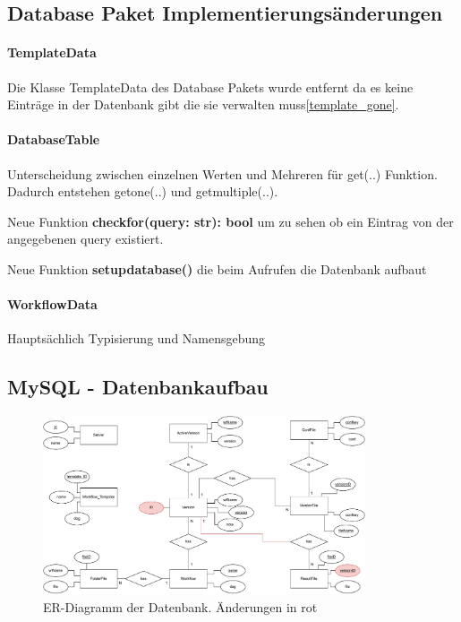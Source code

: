 \subsection{Database Paket Implementierungsänderungen}
\paragraph{TemplateData} Die Klasse TemplateData des Database Pakets wurde entfernt da es keine Einträge in der Datenbank gibt die sie verwalten muss\ref{template_gone}.


\paragraph{DatabaseTable} Unterscheidung zwischen einzelnen Werten und Mehreren für get(..) Funktion. Dadurch entstehen get\textunderscore one(..) und get\textunderscore multiple(..).

Neue Funktion \textbf{check\textunderscore for(query: str): bool} um zu sehen ob ein Eintrag von der angegebenen query existiert.

Neue Funktion \textbf{setup\textunderscore database()} die beim Aufrufen die Datenbank aufbaut

\paragraph{WorkflowData} Hauptsächlich Typisierung und Namensgebung 

\newpage

\subsection{MySQL - Datenbankaufbau}

\begin{figure}[h]
	\centering
	\includegraphics[width=0.85\textwidth]{res/er_diagram.pdf} 
	\caption{ER-Diagramm der Datenbank. Änderungen in rot}
	\label{fig:er_diagram}
\end{figure}

